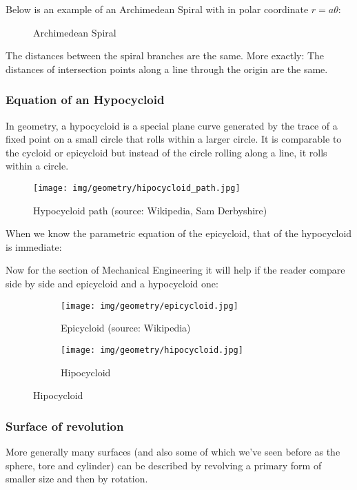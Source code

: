 {	Below is an example of an Archimedean Spiral with in polar coordinate $r=a\theta$:
	\begin{figure}[H]
		\centering
		\caption{Archimedean Spiral}
	\end{figure}
	
	The distances between the spiral branches are the same. More exactly: The distances of intersection points along a line through the origin are the same. 
	
	\subsubsection{Equation of an Hypocycloid}
	In geometry, a hypocycloid is a special plane curve generated by the trace of a fixed point on a small circle that rolls within a larger circle. It is comparable to the cycloid or epicycloid but instead of the circle rolling along a line, it rolls within a circle.
	\begin{figure}[H]
		\centering
		\texttt{[image: img/geometry/hipocycloid\_path.jpg]}
		\caption[Hypocycloid path]{Hypocycloid path (source: Wikipedia, Sam Derbyshire)}
	\end{figure}
	When we know the parametric equation of the epicycloid, that of the hypocycloid is immediate:
	
	Now for the section of Mechanical Engineering it will help if the reader compare side by side and epicycloid and a hypocycloid one:
	\begin{figure}[H]
		\centering
		\begin{subfigure}{.4\textwidth}
		  \centering
		  \texttt{[image: img/geometry/epicycloid.jpg]}
		  \caption[Epicycloid]{Epicycloid (source: Wikipedia)}
		\end{subfigure}
		\begin{subfigure}{.4\textwidth}
		  \centering
		  \texttt{[image: img/geometry/hipocycloid.jpg]}
		  \caption{Hipocycloid}
		\end{subfigure}
	\end{figure}
		
	
	
	\pagebreak
	\subsubsection{Surface of revolution}
	More generally many surfaces (and also some of which we've seen before as the sphere, tore and cylinder) can be described by revolving a primary form of smaller size and then by rotation.
	
}
